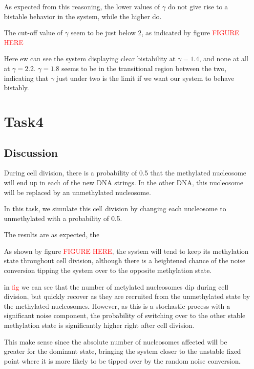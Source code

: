 \documentclass{article}
\begin{document}
As expected from this reasoning, the lower values of $\gamma$ do not give rise to a bistable behavior in the system, while the higher do. 

The cut-off value of $\gamma$ seem to be just below 2, as indicated by figure \textcolor{red}{FIGURE HERE}

Here ew can see the system displaying clear bistability at $\gamma = 1.4$, and none at all at $\gamma= 2.2$. $\gamma= 1.8$ seems to be in the transitional region between the two, indicating that $\gamma$ just under two is the limit if we want our system to behave bistably. 






\section{Task4}
\subsection{Discussion}
During cell division, there is a probability of 0.5 that the methylated nucleosome will end up in each of the new DNA strings. In the other DNA, this nucleosome will be replaced by an unmethylated nucleosome. 

In this task, we simulate this cell division by changing each nucleosome to unmethylated with a probability of 0.5.

The results are as expected, the

As shown by figure \textcolor{red}{FIGURE HERE}, the system will tend to keep its methylation state throughout cell division, although there is a heightened chance of the noise conversion tipping the system over to the opposite methylation state. 


in \textcolor{red}{ fig  } we can see that the number of metylated nucleosomes dip during cell division, but quickly recover as they are recruited from the unmethylated state by the methylated nucleosomes. However, as this is a stochastic process with a significant noise component, the probability of switching over to the other stable methylation state is significantly higher right after cell division. 

This make sense since the absolute number of nucleosomes affected will be greater for the dominant state, bringing the system closer to the unstable fixed point where it is more likely to be tipped over by the random noise conversion. 
 
\end{document}
